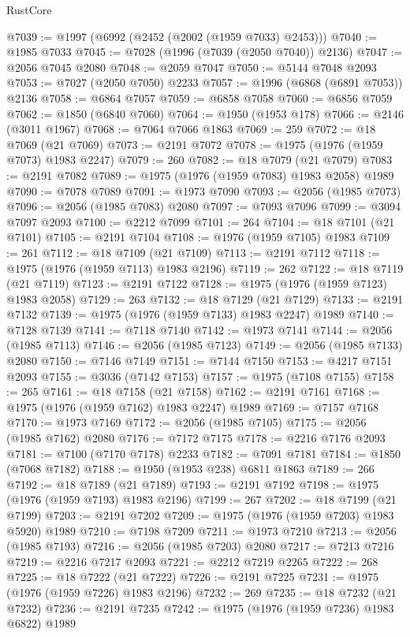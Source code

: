 \begin{lexlean}{RustCore}
\begin{coremodule}
@7039 := @1997 (@6992 (@2452 (@2002 (@1959 @7033) @2453)))
@7040 := @1985 @7033
@7045 := @7028 (@1996 (@7039 (@2050 @7040)) @2136)
@7047 := @2056 @7045 @2080
@7048 := @2059 @7047
@7050 := @5144 @7048 @2093
@7053 := @7027 (@2050 @7050) @2233
@7057 := @1996 (@6868 (@6891 @7053)) @2136
@7058 := @6864 @7057
@7059 := @6858 @7058
@7060 := @6856 @7059
@7062 := @1850 (@6840 @7060)
@7064 := @1950 (@1953 @178)
@7066 := @2146 (@3011 @1967)
@7068 := @7064 @7066 @1863
@7069 := 259
@7072 := @18 @7069 (@21 @7069)
@7073 := @2191 @7072
@7078 := @1975 (@1976 (@1959 @7073) @1983 @2247)
@7079 := 260
@7082 := @18 @7079 (@21 @7079)
@7083 := @2191 @7082
@7089 := @1975 (@1976 (@1959 @7083) @1983 @2058) @1989
@7090 := @7078 @7089
@7091 := @1973 @7090
@7093 := @2056 (@1985 @7073)
@7096 := @2056 (@1985 @7083) @2080
@7097 := @7093 @7096
@7099 := @3094 @7097 @2093
@7100 := @2212 @7099
@7101 := 264
@7104 := @18 @7101 (@21 @7101)
@7105 := @2191 @7104
@7108 := @1976 (@1959 @7105) @1983
@7109 := 261
@7112 := @18 @7109 (@21 @7109)
@7113 := @2191 @7112
@7118 := @1975 (@1976 (@1959 @7113) @1983 @2196)
@7119 := 262
@7122 := @18 @7119 (@21 @7119)
@7123 := @2191 @7122
@7128 := @1975 (@1976 (@1959 @7123) @1983 @2058)
@7129 := 263
@7132 := @18 @7129 (@21 @7129)
@7133 := @2191 @7132
@7139 := @1975 (@1976 (@1959 @7133) @1983 @2247) @1989
@7140 := @7128 @7139
@7141 := @7118 @7140
@7142 := @1973 @7141
@7144 := @2056 (@1985 @7113)
@7146 := @2056 (@1985 @7123)
@7149 := @2056 (@1985 @7133) @2080
@7150 := @7146 @7149
@7151 := @7144 @7150
@7153 := @4217 @7151 @2093
@7155 := @3036 (@7142 @7153)
@7157 := @1975 (@7108 @7155)
@7158 := 265
@7161 := @18 @7158 (@21 @7158)
@7162 := @2191 @7161
@7168 := @1975 (@1976 (@1959 @7162) @1983 @2247) @1989
@7169 := @7157 @7168
@7170 := @1973 @7169
@7172 := @2056 (@1985 @7105)
@7175 := @2056 (@1985 @7162) @2080
@7176 := @7172 @7175
@7178 := @2216 @7176 @2093
@7181 := @7100 (@7170 @7178) @2233
@7182 := @7091 @7181
@7184 := @1850 (@7068 @7182)
@7188 := @1950 (@1953 @238) @6811 @1863
@7189 := 266
@7192 := @18 @7189 (@21 @7189)
@7193 := @2191 @7192
@7198 := @1975 (@1976 (@1959 @7193) @1983 @2196)
@7199 := 267
@7202 := @18 @7199 (@21 @7199)
@7203 := @2191 @7202
@7209 := @1975 (@1976 (@1959 @7203) @1983 @5920) @1989
@7210 := @7198 @7209
@7211 := @1973 @7210
@7213 := @2056 (@1985 @7193)
@7216 := @2056 (@1985 @7203) @2080
@7217 := @7213 @7216
@7219 := @2216 @7217 @2093
@7221 := @2212 @7219 @2265
@7222 := 268
@7225 := @18 @7222 (@21 @7222)
@7226 := @2191 @7225
@7231 := @1975 (@1976 (@1959 @7226) @1983 @2196)
@7232 := 269
@7235 := @18 @7232 (@21 @7232)
@7236 := @2191 @7235
@7242 := @1975 (@1976 (@1959 @7236) @1983 @6822) @1989

\end{coremodule}
\end{lexlean}
